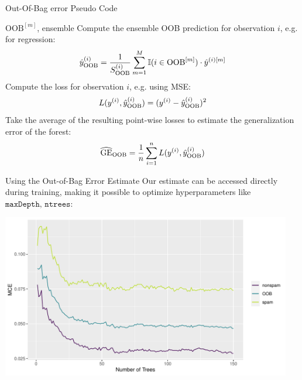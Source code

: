 \documentclass[11pt,compress,t,notes=noshow,xcolor=table]{beamer}
\begin{document}
\begin{vbframe}{Out-Of-Bag error Pseudo Code}
\begin{algorithm}[H]
  \footnotesize
  \caption*{Out-Of-Bag error calculation}
  \begin{algorithmic}[1]
     $\text{OOB}^{[m]}$, ensemble
      \State Compute the ensemble OOB prediction for observation $i$, e.g. for regression:
      $$\hat{y}^{(i)}_{\text{OOB}} =
      \frac{1}{S_{\text{OOB}}^{(i)}} \sum_{m = 1}^{M} 
      \mathbb{I}(i \in \text{OOB}^{[m]}) \cdot \hat{y}^{(i)[m]} $$
      \State Compute the loss for observation $i$, e.g. using MSE:
      $$ L(y^{(i)}, \hat{y}^{(i)}_{\text{OOB}}) = (y^{(i)} - \hat{y}^{(i)}_{\text{OOB}})^2$$
    \EndFor
    \State Take the average of the resulting point-wise losses to estimate the generalization error of the forest: $$\widehat{\mathrm{GE}}_{\text{OOB}} = \frac{1}{n} \sum\limits_{i=1}^n L(y^{(i)}, \hat{y}^{(i)}_{\text{OOB}})$$
  
  \end{algorithmic}
\end{algorithm}
\end{vbframe}

\begin{vbframe}{Using the Out-of-Bag Error Estimate}
Our estimate can be accessed directly during training, making it possible to optimize hyperparameters like $\texttt{maxDepth, ntrees}$:

\vspace{1em}

\begin{knitrout}\scriptsize
{}\color{fgcolor}

{\centering \includegraphics[width=0.95\textwidth]{figure/forest-oob.pdf} 

}
\end{knitrout}

\end{vbframe}
\end{document}

